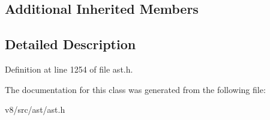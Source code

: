 \subsection*{Additional Inherited Members}


\subsection{Detailed Description}


Definition at line 1254 of file ast.\+h.



The documentation for this class was generated from the following file\+:\begin{DoxyCompactItemize}
\item 
v8/src/ast/ast.\+h\end{DoxyCompactItemize}
